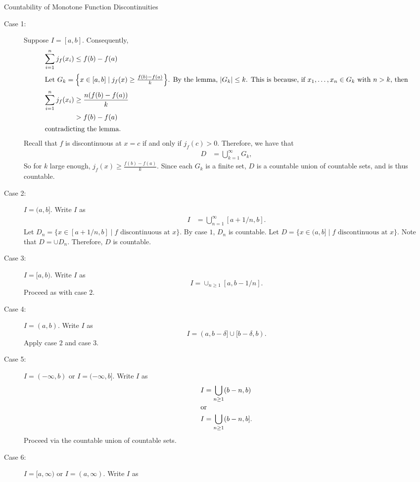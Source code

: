 \documentclass[10pt]{extarticle}
\begin{document}
\begin{problem}{Countability of Monotone Function Discontinuities}
\begin{description}
      \item[Case 1:] Suppose $I = [a,b]$. Consequently,
        \begin{align*}
          \sum_{i=1}^{n} j_f(x_i) &\leq f(b) - f(a)\\
          \shortintertext{Let $G_k = \left\{x\in [a,b]\mid j_f(x) \geq \frac{f(b) - f(a)}{k}\right\}$. By the lemma, $|G_k| \leq k$. This is because, if $x_1,\dots,x_n\in G_k$ with $n > k$, then}
          \sum_{i=1}^{n}j_f(x_i)&\geq \frac{n(f(b)-f(a))}{k}\\
                                &> f(b) - f(a)\\
                                \shortintertext{contradicting the lemma.}
        \end{align*}
        Recall that $f$ is discontinuous at $x=c$ if and only if $j_f(c) > 0$. Therefore, we have that
        \begin{align*}
          D &= \bigcup_{k=1}^{\infty}G_k,
        \end{align*}
        So for $k$ large enough, $j_f(x) \geq \frac{f(b) - f(a)}{k}$. Since each $G_k$ is a finite set, $D$ is a countable union of countable sets, and is thus countable.
      \item[Case 2:] $I = (a,b]$. Write $I$ as
        \begin{align*}
          I &= \bigcup_{n=1}^{\infty}[a + 1/n,b].
        \end{align*}
        Let $D_n = \{x\in [a + 1/n,b]\mid f\text{ discontinuous at }x\}$. By case $1$, $D_n$ is countable. Let $D = \{x\in (a,b]\mid f\text{ discontinuous at } x\}$. Note that $D = \cup D_n$. Therefore, $D$ is countable.
      \item[Case 3:] $I = [a,b)$. Write $I$ as $$I = \cup_{n\geq1}[a,b-1/n].$$ Proceed as with case $2$.
      \item[Case 4:] $I = (a,b)$. Write $I$ as $$I = (a,b-\delta]\cup [b-\delta,b).$$ Apply case $2$ and case $3$.
      \item[Case 5:] $I = (-\infty,b)$ or $I = (-\infty,b]$. Write $I$ as
        \begin{align*}
          I &= \bigcup_{n\geq 1} (b-n,b)\\
          \shortintertext{or}
          I &= \bigcup_{n\geq 1}(b-n,b].
        \end{align*}
        Proceed via the countable union of countable sets.
      \item[Case 6:] $I = [a,\infty)$ or $I = (a,\infty)$. Write $I$ as
        \begin{align*}

\end{align*}
\end{description}
\end{problem}
\end{document}
